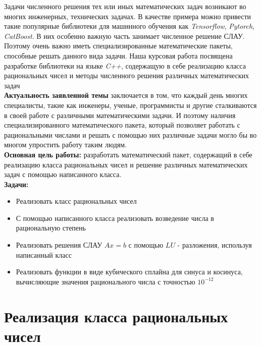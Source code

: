 \documentclass[a4paper,article,14pt]{extarticle}
\begin{document}


\tableofcontents
\pagebreak


Задачи численного решения тех или иных математических задач возникают во многих инженерных, технических задачах.
В качестве примера можно привести такие популярные библиотеки для машинного обучения как \emph{Tensorflow}, 
\emph{Pytorch}, \emph{CatBoost}.
В них особенно важную часть занимает численное решение СЛАУ. 
Поэтому очень важно иметь специализированные математические пакеты, способные решать данного вида задачи. 
Наша курсовая работа посвящена разработке библиотеки на языке \emph{C++},
содержащую в себе реализацию класса рациональных чисел и методы
численного решения различных математических задач \\

\textbf{Актуальность заявленной темы} заключается в том,
что каждый день многих специалисты, такие как инженеры, ученые, программисты
и другие сталкиваются в своей работе с различными математическими задачи.
И поэтому наличия специализированного математического пакета,
который позволяет работать с рациональными числами и решать с помощью них 
различные задачи могло бы во многом упростить работу таким людям. \\

\textbf{Основная цель работы:} разработать математический пакет,
содержащий в себе реализацию класса рациональных чисел и решение 
различных математических задач с помощью написанного класса. \\

\textbf{Задачи:} 

\begin{itemize}
    \item Реализовать класс рациональных чисел
    \item С помощью написанного класса реализовать возведение числа в рациональную степень
    \item Реализовать решения СЛАУ $Ax = b$ с помощью $LU$ - разложения, используя написанный класс
    \item Реализовать функции в виде кубического сплайна для синуса и косинуса, вычисляющие значения рационального числа с точностью $10^{-12}$
\end{itemize}


\section{Реализация класса рациональных чисел}
\end{document}
